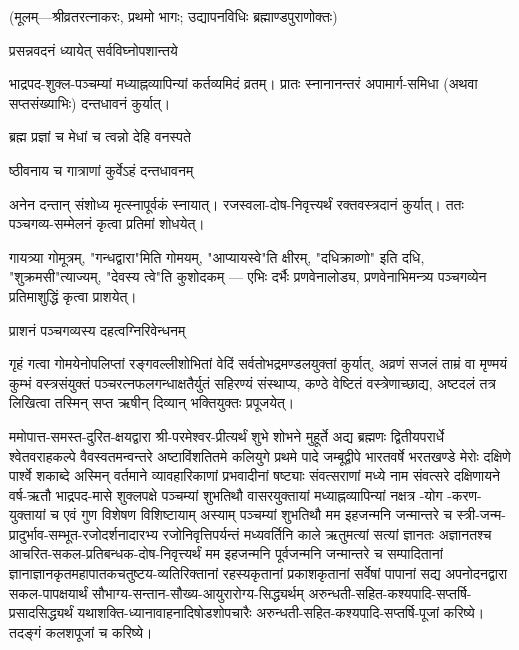 
\centerline{\small{(मूलम्—श्रीव्रतरत्नाकरः, प्रथमो भागः; उद्यापनविधिः ब्रह्माण्डपुराणोक्तः)}}




{प्रसन्नवदनं ध्यायेत् सर्वविघ्नोपशान्तये}

भाद्रपद-शुक्ल-पञ्चम्यां मध्याह्नव्यापिन्यां कर्तव्यमिदं व्रतम्। प्रातः स्नानानन्तरं
अपामार्ग-समिधा (अथवा सप्तसंख्याभिः) दन्तधावनं कुर्यात्।

{ब्रह्म प्रज्ञां च मेधां च त्वन्नो देहि वनस्पते}

{ष्ठीवनाय च गात्राणां कुर्वेऽहं दन्तधावनम्}

अनेन दन्तान् संशोध्य मृत्स्नापूर्वकं स्नायात्। रजस्वला-दोष-निवृत्त्यर्थं रक्तवस्त्रदानं
कुर्यात्। ततः पञ्चगव्य-सम्मेलनं कृत्वा प्रतिमां शोधयेत्।

गायत्र्या गोमूत्रम्, "गन्धद्वारा"मिति गोमयम्, "आप्यायस्वे"ति क्षीरम्,
"दधिक्राव्णो" इति दधि, "शुक्रमसी"त्याज्यम्, "देवस्य त्वे"ति कुशोदकम् — एभिः
दर्भैः प्रणवेनालोड्य, प्रणवेनाभिमन्त्र्य पञ्चगव्येन प्रतिमाशुद्धिं कृत्वा प्राशयेत्।

{प्राशनं पञ्चगव्यस्य दहत्वग्निरिवेन्धनम्}

गृहं गत्वा गोमयेनोपलिप्तां रङ्गवल्लीशोभितां वेदिं सर्वतोभद्रमण्डलयुक्तां
कुर्यात्, अव्रणं सजलं ताम्रं वा मृण्मयं कुम्भं वस्त्रसंयुक्तं
पञ्चरत्नफलगन्धाक्षतैर्युतं सहिरण्यं संस्थाप्य, कण्ठे वेष्टितं वस्त्रेणाच्छाद्य,
अष्टदलं तत्र लिखित्वा तस्मिन् सप्त ऋषीन् दिव्यान् भक्तियुक्तः प्रपूजयेत्।


ममोपात्त-समस्त-दुरित-क्षयद्वारा श्री-परमेश्वर-प्रीत्यर्थं शुभे शोभने मुहूर्ते अद्य ब्रह्मणः
द्वितीयपरार्धे श्वेतवराहकल्पे वैवस्वतमन्वन्तरे अष्टाविंशतितमे कलियुगे प्रथमे पादे
जम्बूद्वीपे भारतवर्षे भरतखण्डे मेरोः दक्षिणे पार्श्वे शकाब्दे अस्मिन् वर्तमाने व्यावहारिकाणां
प्रभवादीनां षष्ट्याः संवत्सराणां मध्ये \blank{} नाम संवत्सरे दक्षिणायने
वर्ष-ऋतौ भाद्रपद-मासे शुक्लपक्षे पञ्चम्यां शुभतिथौ \blank{} वासरयुक्तायां मध्याह्नव्यापिन्यां
\blank{} नक्षत्र \blank{}-योग \blank{}-करण-युक्तायां च एवं गुण विशेषण विशिष्टायाम्
अस्याम् पञ्चम्यां शुभतिथौ
मम इहजन्मनि जन्मान्तरे च स्त्री-जन्म-प्रादुर्भाव-सम्भूत-रजोदर्शनादारभ्य रजोनिवृत्तिपर्यन्तं
मध्यवर्तिनि काले ऋतुमत्यां सत्यां ज्ञानतः अज्ञानतश्च आचरित-सकल-प्रतिबन्धक-दोष-निवृत्त्यर्थं
मम इहजन्मनि पूर्वजन्मनि जन्मान्तरे च सम्पादितानां ज्ञानाज्ञानकृतमहा\-पातकचतुष्टय-व्यतिरिक्तानां
रहस्यकृतानां प्रकाशकृतानां सर्वेषां पापानां सद्य अपनोदनद्वारा सकल-पापक्षयार्थं
सौभाग्य-सन्तान-सौख्य-आयुरारोग्य-सिद्ध्यर्थम् अरुन्धती-सहित-कश्यपादि-सप्तर्षि-प्रसादसिद्ध्यर्थं
यथाशक्ति-ध्यानावाहनादिषोडशोपचारैः अरुन्धती-सहित-कश्यपादि-सप्तर्षि-पूजां करिष्ये। तदङ्गं कलशपूजां च करिष्ये।

